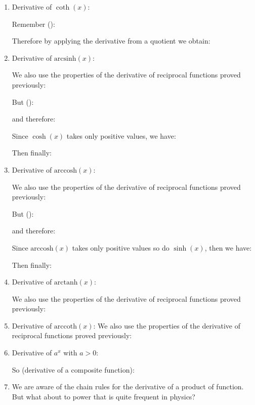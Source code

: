 \begin{enumerate}
		 	\item Derivative of $\coth(x)$:
		 	
		 	Remember ():
		 	
		 	Therefore by applying the derivative from a quotient we obtain:
		 	
		 	
		 	\item Derivative of $\text{arcsinh}(x)$:
		 	
		 	We also use the properties of the derivative of reciprocal functions proved previously:
		 	
		 	But ():
		 	
		 	and therefore:
		 	
		 	Since $\cosh(x)$ takes only positive values, we have:
		 	
		 	Then finally:
		 	
		 	
		 	\item Derivative of $\text{arccosh}(x)$:
		 	
		 	We also use the properties of the derivative of reciprocal functions proved previously:
		 	
		 	But ():
		 	
		 	and therefore:
		 	
		 	Since $\text{arccosh}(x)$ takes only positive values so do $\sinh(x)$, then we have:
		 	
		 	Then finally:
		 	
		 	
		 	\item Derivative of $\text{arctanh}(x)$:
		 	
		 	We also use the properties of the derivative of reciprocal functions proved previously:
		 	
		 	
		 	\item Derivative of $\text{arccoth}(x)$:
		 	We also use the properties of the derivative of reciprocal functions proved previously:
		 	
		 	
		 	\item Derivative of $a^x$ with $a>0$:
		 	
		 	So (derivative of a composite function):
		 	
		 	
		 	\item We are aware of the chain rules for the derivative of a product of function. But what about to power that is quite frequent in physics?
	

\end{enumerate}
